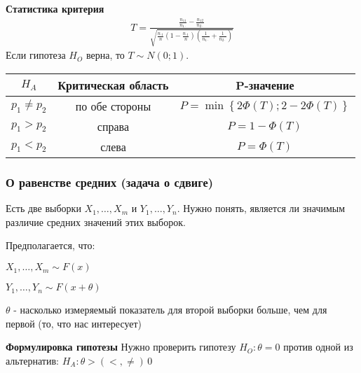 \documentclass[12pt]{extarticle}
\begin{document}
\par\textbf{Статистика критерия}
\begin{eqnarray*}
T=\frac
{\frac{n_{11}}{n_{1\cdot}}-\frac{n_{12}}{n_{2\cdot}}}
{\sqrt{\frac{n_{\cdot 1}}{n}
        (1-\frac{n_{\cdot 1}}{n})
    (\frac{1}{n_{1\cdot}}+\frac{1}{n_{2\cdot}})
}}
\end{eqnarray*}
Если гипотеза $H_{O}$ верна, то $T\sim N(0;1)$.
\begin{center} \begin{tabular}{c|c|c}
    $H_{A}$ & Критическая область & P-значение \\\hline
    $p_{1}\neq p_{2}$ & по обе стороны &
    $P=\min\left\{2\Phi(T);2-2\Phi(T)\right\}$\\\hline
    $p_{1}>p_{2}$ & справа & $P=1-\Phi(T)$ \\\hline
    $p_{1}<p_{2}$ & слева & $P=\Phi(T)$ \\
\end{tabular} \end{center}


\subsubsection{О равенстве средних (задача о сдвиге)}
Есть две выборки $X_{1},\ldots,X_{m}$ и $Y_{1},\ldots,Y_{n}$. Нужно
понять, является ли значимым различие средних значений этих выборок.
\par Предполагается, что:
\begin{description}
    \item $X_{1},\ldots,X_{m}\sim F(x)$
    \item $Y_{1},\ldots,Y_{n}\sim F(x+\theta)$
\end{description}
$\theta$ - насколько измеряемый показатель для второй выборки больше,
чем для первой (то, что нас интересует)
\par\textbf{Формулировка гипотезы} Нужно проверить гипотезу
$H_{O}:\theta=0$ против одной из альтернатив: $H_{A}:\theta >(<,\neq)\,0$
\end{document}

